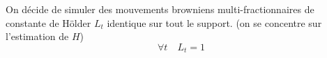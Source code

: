 
On décide de simuler des mouvements browniens multi-fractionnaires de constante de Hölder $L_t$ identique sur tout le support. (\edited on se concentre sur l'estimation de $H$)
\begin{equation*}
	\forall t \quad L_t = 1
\end{equation*}


